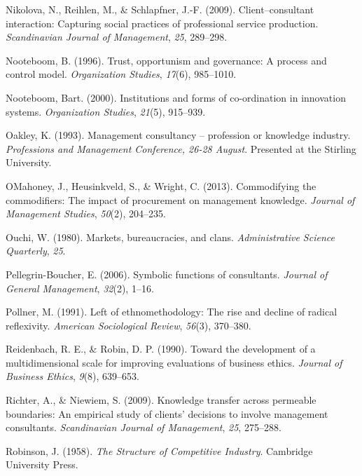 \documentclass[
  man,floatsintext]{apa6}
\newlength{\cslhangindent}
\newenvironment{CSLReferences}[2] %
 {\begin{list}{}{%
  \setlength{\itemindent}{0pt}
  \setlength{\leftmargin}{0pt}
  \setlength{\parsep}{0pt}
  \ifodd #1
   \setlength{\leftmargin}{\cslhangindent}
   \setlength{\itemindent}{-1\cslhangindent}
  \fi
  \setlength{\itemsep}{#2\baselineskip}}}
 {\end{list}}
\begin{document}
\begin{CSLReferences}{1}{0}
Nikolova, N., Reihlen, M., \& Schlapfner, J.-F. (2009). Client--consultant interaction: Capturing social practices of professional service production. \emph{Scandinavian Journal of Management}, \emph{25}, 289--298.

Nooteboom, B. (1996). Trust, opportunism and governance: A process and control model. \emph{Organization Studies}, \emph{17}(6), 985--1010.

Nooteboom, Bart. (2000). Institutions and forms of co-ordination in innovation systems. \emph{Organization Studies}, \emph{21}(5), 915--939.

Oakley, K. (1993). Management consultancy -- profession or knowledge industry. \emph{Professions and Management Conference, 26-28 August}. Presented at the Stirling University.

OMahoney, J., Heusinkveld, S., \& Wright, C. (2013). Commodifying the commodifiers: The impact of procurement on management knowledge. \emph{Journal of Management Studies}, \emph{50}(2), 204--235.

Ouchi, W. (1980). Markets, bureaucracies, and clans. \emph{Administrative Science Quarterly}, \emph{25}.

Pellegrin-Boucher, E. (2006). Symbolic functions of consultants. \emph{Journal of General Management}, \emph{32}(2), 1--16.

Pollner, M. (1991). Left of ethnomethodology: The rise and decline of radical reflexivity. \emph{American Sociological Review}, \emph{56}(3), 370--380.

Reidenbach, R. E., \& Robin, D. P. (1990). Toward the development of a multidimensional scale for improving evaluations of business ethics. \emph{Journal of Business Ethics}, \emph{9}(8), 639--653.

Richter, A., \& Niewiem, S. (2009). Knowledge transfer across permeable boundaries: An empirical study of clients' decisions to involve management consultants. \emph{Scandinavian Journal of Management}, \emph{25}, 275--288.

Robinson, J. (1958). \emph{{The Structure of Competitive Industry}}. Cambridge University Press.


\end{CSLReferences}
\end{document}

